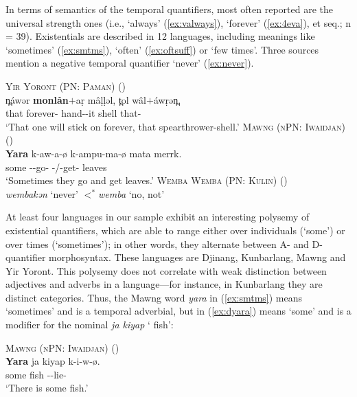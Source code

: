 \documentclass[12pt,egregdoesnotlikesansseriftitles]{scrartcl}
\begin{document}
In terms of semantics of the temporal quantifiers, most often reported are the universal strength ones (i.e., `always' (\ref{ex:valways}), `forever' (\ref{ex:4eva}), et seq.; n = 39). %
Existentials are described in 12 languages, including meanings like `sometimes' (\ref{ex:smtms}), `often' (\ref{ex:oftsuff}) or `few times'. Three sources mention a negative temporal quantifier `never' (\ref{ex:never}).
\begin{exe}
  \ex\label{ex:4eva} \textsc{Yir Yoront (PN: Paman)} (\citealt[343]{alpher73})\\
  \gll n̪\'awər \textbf{monlån}$+$a\d{r} m\^a\d{l}\d{l}əl, t̪ol w\^al$+$\'aw\d{r}ən̪.\\
  that forever-\Sel{} hand-\Np-it shell that-\Sub\\
  \glt `That one will stick on forever, that spearthrower-shell.'
  \ex\label{ex:smtms} \textsc{Mawng (nPN: Iwaidjan)} (\citealt{ngaralk})\\
  \gll \textbf{Yara} k-aw-a-ø k-ampu-ma-ø mata merrk.\\
  some \Prs-\Tpl-go-\Np{} \Prs-\Tpl/\Third\Clveg-get-\Np{} \Clveg{} leaves\\
  \glt `Sometimes they go and get leaves.' %
  \ex\label{ex:never} \textsc{Wemba Wemba (PN: Kulin)} (\citealt[47]{hercus92})\\
  \textit{\charis wembakən} `never' $<^*$\textit{wemba} `no, not'
\end{exe}

At least four languages in our sample exhibit an interesting polysemy of existential quantifiers, which are able to range either over individuals (`some') or over times (`sometimes'); in other words, they alternate between A- and D-quantifier morphosyntax. These languages are Djinang, Kunbarlang, Mawng and Yir Yoront. This polysemy does not correlate with weak distinction between adjectives and adverbs in a language---for instance, in Kunbarlang they are distinct categories. Thus, the Mawng word \textit{yara} in (\ref{ex:smtms}) means `sometimes' and is a temporal adverbial, but in (\ref{ex:dyara}) means `some' and is a modifier for the nominal \textit{ja kiyap} `\Clm{} fish':
\begin{exe}
  \ex\label{ex:dyara} \textsc{Mawng (nPN: Iwaidjan)} (\citealt{ngaralk})\\
  \gll \textbf{Yara} ja kiyap k-i-w-ø.\\
  some \Clm{} fish \Prs-\Tsg\Clm-lie-\Np\\
  \glt `There is some fish.' %
\end{exe}
\end{document}

